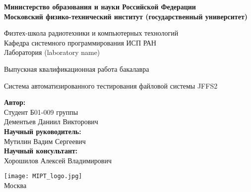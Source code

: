 \begin{center}
    \large\textbf{Министерство образования и науки Российской Федерации \\
    Московский физико-технический институт (государственный
    университет)} \\
    \vspace{1cm}

    Физтех-школа радиотехники и компьютерных технологий \\

    Кафедра системного программирования ИСП РАН \\
    Лаборатория (laboratory name)\\

    \vspace{3em}

    Выпускная квалификационная работа бакалавра
\end{center}

\begin{center}
    \vspace{\fill}
    \LARGE{Система автоматизированного тестирования файловой системы JFFS2}

    \vspace{\fill}
\end{center}


\begin{flushright}
    \textbf{Автор:} \\
    Студент Б01-009 группы \\
    Дементьев Даниил Викторович \\
    \vspace{2em}
    \textbf{Научный руководитель:} \\
    Мутилин Вадим Сергеевич \\
    \vspace{2em}
    \textbf{Научный консультант:} \\
    Хорошилов Алексей Владимирович \\
\end{flushright}

\vspace{7em}

\begin{center}
    \texttt{[image: MIPT\_logo.jpg]}\\
    Москва \the\year{}
\end{center}

\thispagestyle{empty}

\newpage
\setcounter{page}{2}
\fancyfoot[c]{\thepage}
\fancyhead[R]{}